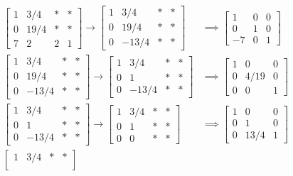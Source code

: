 \documentclass{article}
\begin{document}
\begin{enumerate}
\begin{soln}
\begin{align*}
				\begin{bmatrix}
					1 & 3/4 & * & * \\
					0 & 19/4 & * & * \\
					7 & 2 & 2 & 1
				\end{bmatrix} \to \begin{bmatrix}
					1 & 3/4 & * & * \\
					0 & 19/4 & * & * \\
					0 & -13/4 & * & * 
				\end{bmatrix} &\implies \begin{bmatrix}
					1 & 0 & 0 \\
					0 & 1 & 0 \\
					-7 & 0 & 1
				\end{bmatrix} \\
				\begin{bmatrix}
					1 & 3/4 & * & * \\
					0 & 19/4 & * & * \\
					0 & -13/4 & * & *
				\end{bmatrix} \to \begin{bmatrix}
					1 & 3/4 & * & * \\
					0 & 1 & * & * \\
					0 & -13/4 & * & *
				\end{bmatrix} &\implies \begin{bmatrix}
					1 & 0 & 0 \\
					0 & 4/19 & 0 \\
					0 & 0 & 1
				\end{bmatrix} \\
				\begin{bmatrix}
					1 & 3/4 & * & * \\
					0 & 1 & * & * \\
					0 & -13/4 & * & *
				\end{bmatrix} \to \begin{bmatrix}
					1 & 3/4 & * & * \\
					0 & 1 & * & * \\
					0 & 0 & * & *
				\end{bmatrix} &\implies \begin{bmatrix}
					1 & 0 & 0 \\
					0 & 1 & 0 \\
					0 & 13/4 & 1
				\end{bmatrix} \\
				\begin{bmatrix}
					1 & 3/4 & * & * \\

\end{bmatrix}
\end{align*}
\end{soln}
\end{enumerate}
\end{document}

